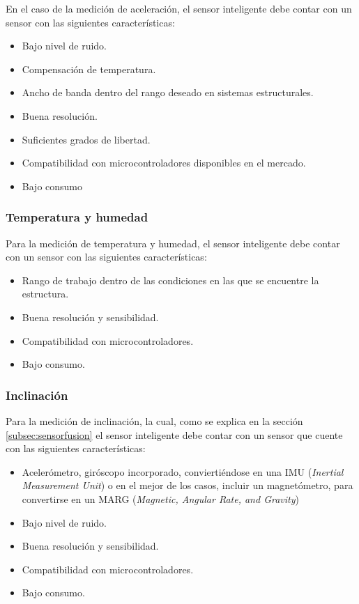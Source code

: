 En el caso de la medición de aceleración, el sensor inteligente debe contar con un sensor con las siguientes características:

\begin{itemize}
    \item Bajo nivel de ruido.
    \item Compensación de temperatura.
    \item Ancho de banda dentro del rango deseado en sistemas estructurales.
    \item Buena resolución.
    \item Suficientes grados de libertad.
    \item Compatibilidad con microcontroladores disponibles en el mercado.
    \item Bajo consumo
\end{itemize}

\subsubsection{Temperatura y humedad}

Para la medición de temperatura y humedad, el sensor inteligente debe contar con un sensor con las siguientes características:

\begin{itemize}
    \item Rango de trabajo dentro de las condiciones en las que se encuentre la estructura.
    \item Buena resolución y sensibilidad.
    \item Compatibilidad con microcontroladores.
    \item Bajo consumo.
\end{itemize}

\subsubsection{Inclinación}

Para la medición de inclinación, la cual, como se explica en la sección \ref{subsec:sensorfusion} el sensor inteligente debe contar con un sensor que cuente con las siguientes características:

\begin{itemize}
    \item Acelerómetro, giróscopo incorporado, conviertiéndose en una IMU (\textit{Inertial Measurement Unit}) o en el mejor de los casos,  incluir un magnetómetro, para convertirse en un MARG (\textit{Magnetic, Angular Rate, and Gravity})
    \item Bajo nivel de ruido.
    \item Buena resolución y sensibilidad.
    \item Compatibilidad con microcontroladores.
    \item Bajo consumo.
\end{itemize}

